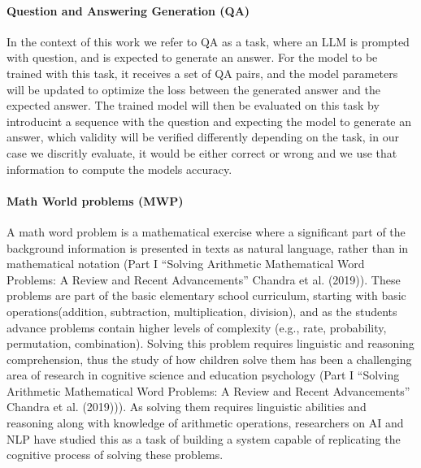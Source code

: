 \documentclass[a4paper,10pt]{article}
\begin{document}
\paragraph{Question and Answering Generation (QA)}
In the context of this work we refer to QA as a task, where an LLM is prompted with question, and is expected to generate an answer. For the model to be trained with this task, it receives  a set of QA pairs, and the model parameters will be updated to optimize the loss between the generated answer and the expected answer. The trained model will then be evaluated on this task by introducint a sequence with the question and expecting the model to generate an answer, which validity will be verified differently depending on the task, in our case we discritly evaluate, it would be either correct or wrong and we use that information to compute the models accuracy.

\paragraph{Math World problems (MWP)}
A math word problem is a mathematical exercise where a significant part of the background information is presented in texts as natural language, rather than in mathematical notation (Part I ``Solving Arithmetic Mathematical Word Problems: A Review and Recent Advancements'' Chandra et al. (2019)). These problems are part of the basic elementary school curriculum, starting with basic operations(addition, subtraction, multiplication, division), and as the students advance problems contain higher levels of complexity (e.g., rate, probability, permutation, combination). Solving this problem requires linguistic and reasoning comprehension, thus the study of how children solve them has been a challenging area of research in cognitive science and education psychology (Part I ``Solving Arithmetic Mathematical Word Problems: A Review and Recent Advancements'' Chandra et al. (2019))). As solving them requires linguistic abilities and reasoning along with knowledge of arithmetic operations, researchers on AI and NLP have studied this as a task of building a system capable of replicating the cognitive process of solving these problems. 
\end{document}

